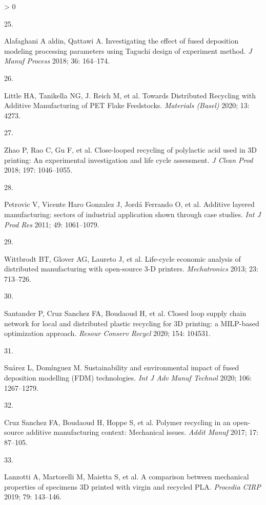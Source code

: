 \documentclass[
  12pt]{article}
\newlength{\cslhangindent}
\newlength{\csllabelwidth}
\newenvironment{CSLReferences}[2] %
 {%
  \setlength{\parindent}{0pt}
  \ifodd #1 \everypar{\setlength{\hangindent}{\cslhangindent}}\ignorespaces\fi
  \ifnum #2 > 0
  \setlength{\parskip}{#2\baselineskip}
  \fi
 }%
 {}
\newcommand{\CSLLeftMargin}[1]{\parbox[t]{\csllabelwidth}{#1}}
\newcommand{\CSLRightInline}[1]{\parbox[t]{\linewidth - \csllabelwidth}{#1}\break}
\begin{document}
\begin{CSLReferences}{0}{0}
\leavevmode\hypertarget{ref-Alafaghani2018}{}%
\CSLLeftMargin{25. }
\CSLRightInline{Alafaghani A aldin, Qattawi A. {Investigating the effect of fused deposition modeling processing parameters using Taguchi design of experiment method}. \emph{J Manuf Process} 2018; 36: 164--174.}

\leavevmode\hypertarget{ref-Little2020}{}%
\CSLLeftMargin{26. }
\CSLRightInline{Little HA, Tanikella NG, J. Reich M, et al. {Towards Distributed Recycling with Additive Manufacturing of PET Flake Feedstocks}. \emph{Materials (Basel)} 2020; 13: 4273.}

\leavevmode\hypertarget{ref-Zhao2018}{}%
\CSLLeftMargin{27. }
\CSLRightInline{Zhao P, Rao C, Gu F, et al. {Close-looped recycling of polylactic acid used in 3D printing: An experimental investigation and life cycle assessment}. \emph{J Clean Prod} 2018; 197: 1046--1055.}

\leavevmode\hypertarget{ref-Petrovic2011}{}%
\CSLLeftMargin{28. }
\CSLRightInline{Petrovic V, Vicente Haro Gonzalez J, Jordá Ferrando O, et al. {Additive layered manufacturing: sectors of industrial application shown through case studies}. \emph{Int J Prod Res} 2011; 49: 1061--1079.}

\leavevmode\hypertarget{ref-Wittbrodt2013}{}%
\CSLLeftMargin{29. }
\CSLRightInline{Wittbrodt BT, Glover AG, Laureto J, et al. {Life-cycle economic analysis of distributed manufacturing with open-source 3-D printers}. \emph{Mechatronics} 2013; 23: 713--726.}

\leavevmode\hypertarget{ref-Santander2020}{}%
\CSLLeftMargin{30. }
\CSLRightInline{Santander P, Cruz Sanchez FA, Boudaoud H, et al. {Closed loop supply chain network for local and distributed plastic recycling for 3D printing: a MILP-based optimization approach}. \emph{Resour Conserv Recycl} 2020; 154: 104531.}

\leavevmode\hypertarget{ref-Suarez2020}{}%
\CSLLeftMargin{31. }
\CSLRightInline{Suárez L, Domínguez M. {Sustainability and environmental impact of fused deposition modelling (FDM) technologies}. \emph{Int J Adv Manuf Technol} 2020; 106: 1267--1279.}

\leavevmode\hypertarget{ref-CruzSanchez2017}{}%
\CSLLeftMargin{32. }
\CSLRightInline{Cruz Sanchez FA, Boudaoud H, Hoppe S, et al. {Polymer recycling in an open-source additive manufacturing context: Mechanical issues}. \emph{Addit Manuf} 2017; 17: 87--105.}

\leavevmode\hypertarget{ref-Lanzotti2019}{}%
\CSLLeftMargin{33. }
\CSLRightInline{Lanzotti A, Martorelli M, Maietta S, et al. {A comparison between mechanical properties of specimens 3D printed with virgin and recycled PLA}. \emph{Procedia CIRP} 2019; 79: 143--146.}


\end{CSLReferences}
\end{document}
